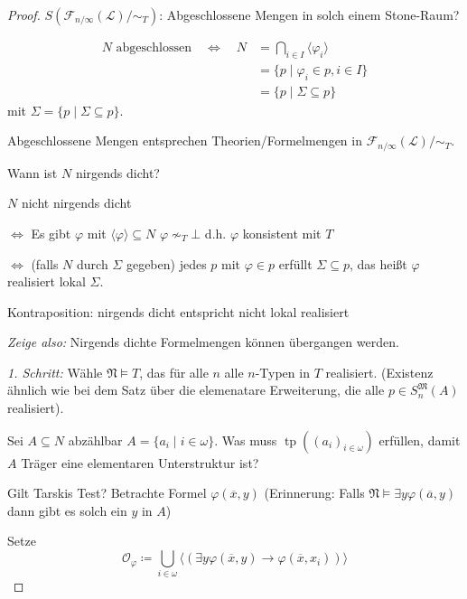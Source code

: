 \documentclass[12pt,parskip=full]{scrartcl}
\theoremstyle{definition}
\begin{document}
	\begin{proof}
		$S(\mathcal{F}_{n/\infty}(\mathcal{L})/\sim_T)$: Abgeschlossene Mengen in solch einem Stone-Raum?
		
		\begin{align*}
			N \text{ abgeschlossen} \quad\Leftrightarrow\quad N &= \bigcap_{i \in I} \langle \varphi_i \rangle \\
			&= \{ p \mid \varphi_i \in p, i \in I \} \\
			&= \{ p \mid \Sigma \subseteq p \}
		\end{align*}
		mit $\Sigma = \{ p \mid \Sigma \subseteq p \}$.
		
		Abgeschlossene Mengen entsprechen Theorien/Formelmengen in $\mathcal{F}_{n/\infty}(\mathcal{L}) / \sim_T$.
		
		Wann ist $N$ nirgends dicht?
		
		$N$ nicht nirgends dicht
		
		$\Leftrightarrow$ Es gibt $\varphi$ mit $\langle \varphi \rangle \subseteq N$ $\varphi \nsim_T \bot$ d.h. $\varphi$ konsistent mit $T$
		
		$\Leftrightarrow$ (falls $N$ durch $\Sigma$ gegeben) jedes $p$ mit $\varphi \in p$ erfüllt $\Sigma \subseteq p$, das heißt $\varphi$ realisiert lokal $\Sigma$.
		
		Kontraposition: nirgends dicht entspricht nicht lokal realisiert
		
		\textit{Zeige also:} Nirgends dichte Formelmengen können übergangen werden.
		
		\textit{1. Schritt:} Wähle $\mathfrak{N} \models T$, das für alle $n$ alle $n$-Typen in $T$ realisiert. (Existenz ähnlich wie bei dem Satz über die elemenatare Erweiterung, die alle $p \in S_n^\mathfrak{M}(A)$ realisiert).
		
		Sei $A \subseteq N$ abzählbar $A = \{ a_i \mid i \in \omega \}$. Was muss $\operatorname{tp}((a_i)_{i \in \omega})$ erfüllen, damit $A$ Träger eine elementaren Unterstruktur ist?
		
		Gilt Tarskis Test? Betrachte Formel $\varphi(\overline{x}, y)$ (Erinnerung: Falls $\mathfrak{N} \models \exists y \varphi(\overline{a}, y)$ dann gibt es solch ein $y$ in $A$)
		
		Setze
		\begin{equation*}
			\mathcal{O}_\varphi \coloneqq \bigcup_{i \in \omega} \langle (\exists y \varphi(\overline{x}, y) \to \varphi(\overline{x}, x_i)) \rangle
		\end{equation*}
		

\end{proof}
\end{document}
